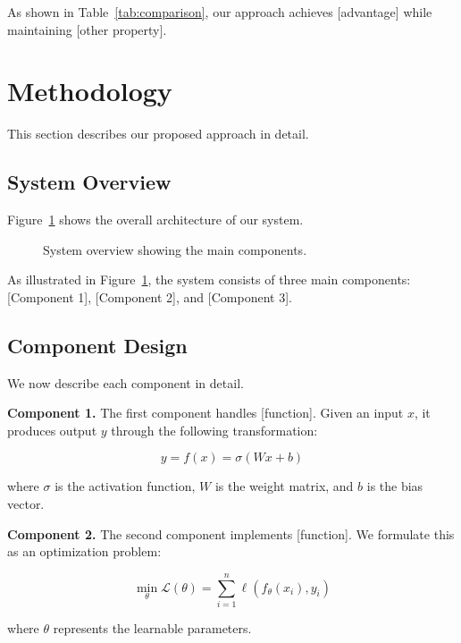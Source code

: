 \documentclass[conference]{IEEEtran}
\theoremstyle{plain}
\theoremstyle{definition}
\begin{document}
As shown in Table~\ref{tab:comparison}, our approach achieves [advantage] 
while maintaining [other property].

\section{Methodology}
\label{sec:method}

This section describes our proposed approach in detail.

\subsection{System Overview}

Figure~\ref{fig:overview} shows the overall architecture of our system.

\begin{figure}[htbp]
\centering
{}
\caption{System overview showing the main components.}
\label{fig:overview}
\end{figure}

As illustrated in Figure~\ref{fig:overview}, the system consists of three 
main components: [Component 1], [Component 2], and [Component 3].

\subsection{Component Design}

We now describe each component in detail.

\textbf{Component 1.} The first component handles [function]. Given an input 
$x$, it produces output $y$ through the following transformation:

\begin{equation}
y = f(x) = \sigma(Wx + b)
\label{eq:component1}
\end{equation}

where $\sigma$ is the activation function, $W$ is the weight matrix, and 
$b$ is the bias vector.

\textbf{Component 2.} The second component implements [function]. We 
formulate this as an optimization problem:

\begin{equation}
\min_{\theta} \mathcal{L}(\theta) = \sum_{i=1}^{n} \ell(f_\theta(x_i), y_i)
\label{eq:optimization}
\end{equation}

where $\theta$ represents the learnable parameters.
\end{document}
